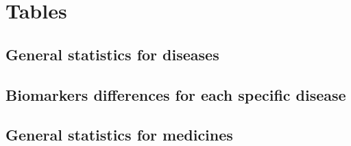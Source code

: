 \documentclass[10pt, a4paper, onecolumn]{article} %
\begin{document}
\listoffigures
\listoftables
\newpage


\section{Tables}

\subsection{General statistics for diseases}

	

	

	

	

\subsection{Biomarkers differences for each specific disease}





\subsection{General statistics for medicines}

	

	

	
\end{document}
